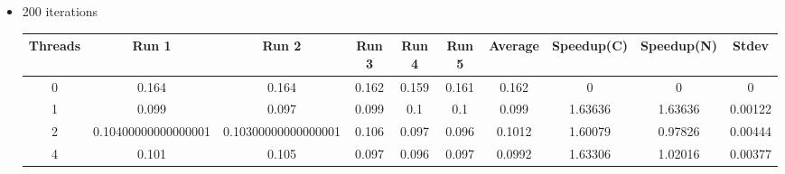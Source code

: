 \begin{itemize}
\item 200 iterations
\begin{center}
 \begin{adjustbox}{width=\columnwidth, center} 
 \begin{tabular}{ | |c | c c c c c | c | c c | c | |} \hline 
 Threads & Run 1 & Run 2 & Run 3 & Run 4 & Run 5 & Average & Speedup(C) & Speedup(N) & Stdev \\ [0.5ex] 
 \hline 
 \hline 
0& 0.164 & 0.164 & 0.162 & 0.159 & 0.161 & 0.162 & 0 & 0 & 0\\ 
 \hline
1& 0.099 & 0.097 & 0.099 & 0.1 & 0.1 & 0.099 & 1.63636 & 1.63636 & 0.00122\\ 
 \hline
2& 0.10400000000000001 & 0.10300000000000001 & 0.106 & 0.097 & 0.096 & 0.1012 & 1.60079 & 0.97826 & 0.00444\\ 
 \hline
4& 0.101 & 0.105 & 0.097 & 0.096 & 0.097 & 0.0992 & 1.63306 & 1.02016 & 0.00377\\ 
 \hline
\end{tabular} 
 \end{adjustbox} 
 \end{center} 
\end{itemize}
